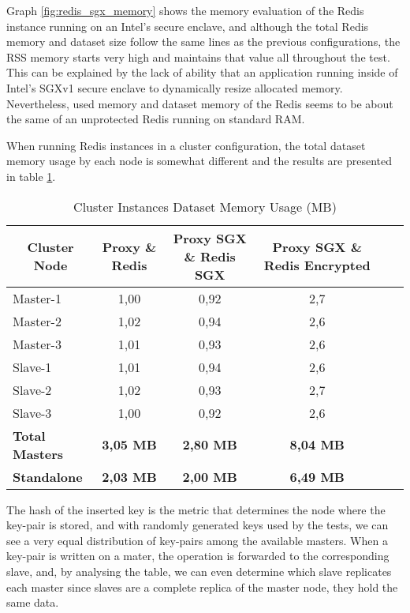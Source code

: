 Graph \ref{fig:redis_sgx_memory} shows the memory evaluation of the Redis instance running on an Intel's secure enclave, and although the total Redis memory and dataset size follow the same lines as the previous configurations, the \gls{RSS} memory starts very high and maintains that value all throughout the test. This can be explained by the lack of ability that an application running inside of Intel's \gls{SGX}v1 secure enclave to dynamically resize allocated memory. Nevertheless, used memory and dataset memory of the Redis seems to be about the same of an unprotected Redis running on standard \gls{RAM}.

When running Redis instances in a cluster configuration, the total dataset memory usage by each node is somewhat different and the results are presented in table \ref{tab:cluster_instances_dataset_memory_usage}.

\begin{table}[ht]
	\caption{Cluster Instances Dataset Memory Usage (MB)}
	\label{tab:cluster_instances_dataset_memory_usage}
\centering
\hspace*{-5mm}
\begin{tabular}{lccccc}
	\toprule
	\multicolumn{1}{c}{\textbf{Cluster Node}} & \multicolumn{1}{c}{\textbf{Proxy \& Redis}} & \textbf{Proxy SGX \& Redis SGX} & \textbf{Proxy SGX \& Redis Encrypted} \\
	\midrule
		Master-1 & 1,00 & 0,92 & 2,7 	\\
		Master-2 & 1,02 & 0,94 & 2,6 	\\
		Master-3 & 1,01 & 0,93 & 2,6 	\\
		Slave-1 & 1,01 & 0,94 & 2,6 		\\
		Slave-2 & 1,02 & 0,93 & 2,7 		\\
		Slave-3 & 1,00 & 0,92 & 2,6 		\\
	\midrule
	\textbf{Total Masters} & \textbf{3,05 MB} & \textbf{2,80 MB} & \textbf{8,04 MB}		\\
	\textbf{Standalone} & \textbf{2,03 MB} & \textbf{2,00 MB} & \textbf{6,49 MB} 		\\
	\bottomrule
\end{tabular}
\end{table}

The hash of the inserted key is the metric that determines the node where the key-pair is stored, and with randomly generated keys used by the tests, we can see a very equal distribution of key-pairs among the available masters. When a key-pair is written on a mater, the operation is forwarded to the corresponding slave, and, by analysing the table, we can even determine which slave replicates each master since slaves are a complete replica of the master node, they hold the same data.

